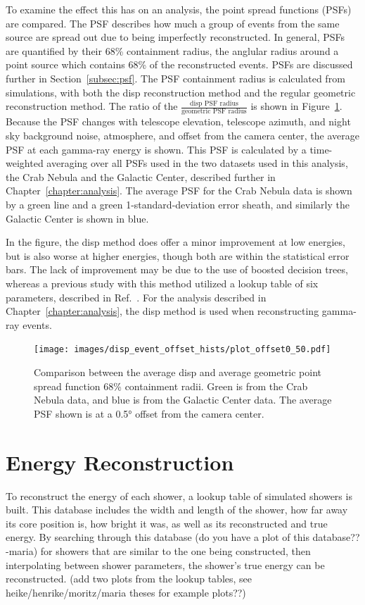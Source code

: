 To examine the effect this has on an analysis, the point spread functions (PSFs) are compared.
The PSF describes how much a group of events from the same source are spread out due to being imperfectly reconstructed.
In general, PSFs are quantified by their 68\% containment radius, the anglular radius around a point source which contains 68\% of the reconstructed events.
PSFs are discussed further in Section~\ref{subsec:psf}.
The PSF containment radius is calculated from simulations, with both the disp reconstruction method and the regular geometric reconstruction method.
The ratio of the $\frac{\textrm{disp PSF radius}}{\textrm{geometric PSF radius}}$ is shown in Figure~\ref{fig:disp_psf_comparison}.
Because the PSF changes with telescope elevation, telescope azimuth, and night sky background noise, atmosphere, and offset from the camera center, the average PSF at each gamma-ray energy is shown.
This PSF is calculated by a time-weighted averaging over all PSFs used in the two datasets used in this analysis, the Crab Nebula and the Galactic Center, described further in Chapter~\ref{chapter:analysis}.
The average PSF for the Crab Nebula data is shown by a green line and a green 1-standard-deviation error sheath, and similarly the Galactic Center is shown in blue.
    
In the figure, the disp method does offer a minor improvement at low energies, but is also worse at higher energies, though both are within the statistical error bars.
The lack of improvement may be due to the use of boosted decision trees, whereas a previous study with this method utilized a lookup table of six parameters, described in Ref.~\cite{Beilicke2012NIM}.
For the analysis described in Chapter~\ref{chapter:analysis}, the disp method is used when reconstructing gamma-ray events.
    
\begin{figure}[b]
  \centering
  \texttt{[image: images/disp\_event\_offset\_hists/plot\_offset0\_50.pdf]}
  \caption[DISP Point Spread Function Comparison]{
    Comparison between the average disp and average geometric point spread function 68\% containment radii.
    Green is from the Crab Nebula data, and blue is from the Galactic Center data.
    The average PSF shown is at a \ang{0.5} offset from the camera center.
  }
  \label{fig:disp_psf_comparison}
\end{figure}

\FloatBarrier

\section{Energy Reconstruction}\label{subsec:enrecon}
To reconstruct the energy of each shower, a lookup table of simulated showers is built.
This database includes the width and length of the shower, how far away its core position is, how bright it was, as well as its reconstructed and true energy.
By searching through this {\color{red}database (do you have a plot of this database?? -maria)} for showers that are similar to the one being constructed, then interpolating between shower parameters, the shower's true energy can be reconstructed.
{\color{red}(add two plots from the lookup tables, see heike/henrike/moritz/maria theses for example plots??)}

